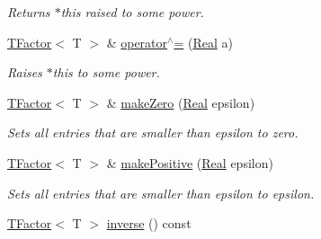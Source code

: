 \begin{CompactItemize}
\begin{CompactList}\small\item\em Returns $\ast$this raised to some power. \item\end{CompactList}\item 
\hypertarget{classdai_1_1TFactor_4cd8337eb9ae63205692a28435322d3b}{
\hyperlink{classdai_1_1TFactor}{TFactor}$<$ T $>$ \& \hyperlink{classdai_1_1TFactor_4cd8337eb9ae63205692a28435322d3b}{operator$^\wedge$=} (\hyperlink{namespacedai_e7d0472fdc89a8635825d01940e91cbf}{Real} a)}
\label{classdai_1_1TFactor_4cd8337eb9ae63205692a28435322d3b}

\begin{CompactList}\small\item\em Raises $\ast$this to some power. \item\end{CompactList}\item 
\hypertarget{classdai_1_1TFactor_8ab0a98ebf512cd5a27e6a2618ed4353}{
\hyperlink{classdai_1_1TFactor}{TFactor}$<$ T $>$ \& \hyperlink{classdai_1_1TFactor_8ab0a98ebf512cd5a27e6a2618ed4353}{makeZero} (\hyperlink{namespacedai_e7d0472fdc89a8635825d01940e91cbf}{Real} epsilon)}
\label{classdai_1_1TFactor_8ab0a98ebf512cd5a27e6a2618ed4353}

\begin{CompactList}\small\item\em Sets all entries that are smaller than epsilon to zero. \item\end{CompactList}\item 
\hypertarget{classdai_1_1TFactor_731c8683fc17269c4bf3f7b52e0c4b40}{
\hyperlink{classdai_1_1TFactor}{TFactor}$<$ T $>$ \& \hyperlink{classdai_1_1TFactor_731c8683fc17269c4bf3f7b52e0c4b40}{makePositive} (\hyperlink{namespacedai_e7d0472fdc89a8635825d01940e91cbf}{Real} epsilon)}
\label{classdai_1_1TFactor_731c8683fc17269c4bf3f7b52e0c4b40}

\begin{CompactList}\small\item\em Sets all entries that are smaller than epsilon to epsilon. \item\end{CompactList}\item 
\hypertarget{classdai_1_1TFactor_de249c30222894e50170a834aca6d708}{
\hyperlink{classdai_1_1TFactor}{TFactor}$<$ T $>$ \hyperlink{classdai_1_1TFactor_de249c30222894e50170a834aca6d708}{inverse} () const }
\label{classdai_1_1TFactor_de249c30222894e50170a834aca6d708}


\end{CompactItemize}
